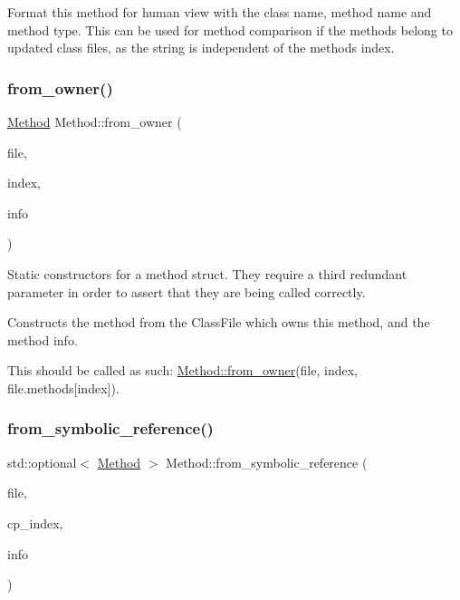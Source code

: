 Format this method for human view with the class name, method name and method type. This can be used for method comparison if the methods belong to updated class files, as the string is independent of the method\textquotesingle{}s index. \mbox{\label{classMethod_ad977afdb14569e1108c6b6849fe0b007}} 
\subsubsection{\texorpdfstring{from\+\_\+owner()}{from\_owner()}}
{\footnotesize\ttfamily \hyperlink{classMethod}{Method} Method\+::from\+\_\+owner (\begin{DoxyParamCaption}\item[{const Class\+File \&}]{file,  }\item[{int}]{index,  }\item[{\hyperlink{structmethod__info}{method\+\_\+info}}]{info }\end{DoxyParamCaption})\hspace{0.3cm}{\ttfamily [static]}}

Static constructors for a method struct. They require a third redundant parameter in order to assert that they are being called correctly.

Constructs the method from the Class\+File which owns this method, and the method info.

This should be called as such\+: \hyperlink{classMethod_ad977afdb14569e1108c6b6849fe0b007}{Method\+::from\+\_\+owner}(file, index, file.\+methods\mbox{[}index\mbox{]}). \mbox{\label{classMethod_adddc54ce699dfb1ba305595507085a29}} 
\subsubsection{\texorpdfstring{from\+\_\+symbolic\+\_\+reference()}{from\_symbolic\_reference()}}
{\footnotesize\ttfamily std\+::optional$<$ \hyperlink{classMethod}{Method} $>$ Method\+::from\+\_\+symbolic\+\_\+reference (\begin{DoxyParamCaption}\item[{const Class\+File \&}]{file,  }\item[{int}]{cp\+\_\+index,  }\item[{\hyperlink{structcp__info}{cp\+\_\+info}}]{info }\end{DoxyParamCaption})\hspace{0.3cm}{\ttfamily [static]}}

